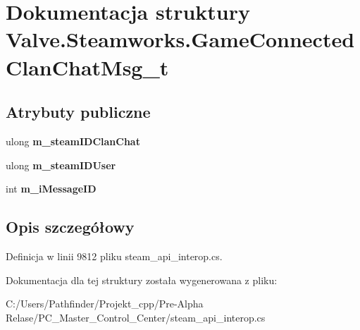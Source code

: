 \hypertarget{struct_valve_1_1_steamworks_1_1_game_connected_clan_chat_msg__t}{}\section{Dokumentacja struktury Valve.\+Steamworks.\+Game\+Connected\+Clan\+Chat\+Msg\+\_\+t}
\label{struct_valve_1_1_steamworks_1_1_game_connected_clan_chat_msg__t}
\subsection*{Atrybuty publiczne}
\begin{DoxyCompactItemize}
\item 
\mbox{\label{struct_valve_1_1_steamworks_1_1_game_connected_clan_chat_msg__t_a1de5a8189a177224f2e173475cd99c4c}} 
ulong {\bfseries m\+\_\+steam\+I\+D\+Clan\+Chat}
\item 
\mbox{\label{struct_valve_1_1_steamworks_1_1_game_connected_clan_chat_msg__t_a854496af4459d6f0ae2818152f2fe04c}} 
ulong {\bfseries m\+\_\+steam\+I\+D\+User}
\item 
\mbox{\label{struct_valve_1_1_steamworks_1_1_game_connected_clan_chat_msg__t_abe5c2938036649f04fea6a9689ba12ac}} 
int {\bfseries m\+\_\+i\+Message\+ID}
\end{DoxyCompactItemize}


\subsection{Opis szczegółowy}


Definicja w linii 9812 pliku steam\+\_\+api\+\_\+interop.\+cs.



Dokumentacja dla tej struktury została wygenerowana z pliku\+:\begin{DoxyCompactItemize}
\item 
C\+:/\+Users/\+Pathfinder/\+Projekt\+\_\+cpp/\+Pre-\/\+Alpha Relase/\+P\+C\+\_\+\+Master\+\_\+\+Control\+\_\+\+Center/steam\+\_\+api\+\_\+interop.\+cs\end{DoxyCompactItemize}
